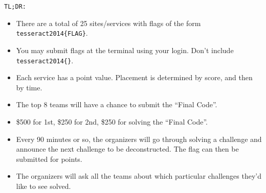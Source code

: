 \documentclass[10pt]{article}
\begin{document}
{\tt TL;DR:}
\begin{itemize}
\item There are a total of 25 sites/services with flags of the form {\tt
    tesseract2014\{FLAG\}}.
\item You may submit flags at the terminal using your login. Don't include {\tt
    tesseract2014\{\}}.
\item Each service has a point value. Placement is determined by score, and then
  by time.
\item The top 8 teams will have a chance to submit the ``Final Code''.
\item \$500 for 1st, \$250 for 2nd, \$250 for solving the ``Final Code''.
\item Every 90 minutes or so, the organizers will go through solving a
  challenge and announce the next challenge to be deconstructed. The flag can
  then be submitted for points.
\item The organizers will ask all the teams about which particular challenges
  they'd like to see solved.
\end{itemize}
\newpage
\newpage
\newpage
\newpage
\newpage
\newpage
\newpage
\newpage
\newpage
\newpage
\newpage
\newpage
\newpage
\newpage
\newpage
\newpage
\newpage
\newpage
\newpage
\newpage
\newpage
\newpage
\newpage
\newpage
\newpage
\newpage
\newpage
\newpage
\newpage
\end{document}

